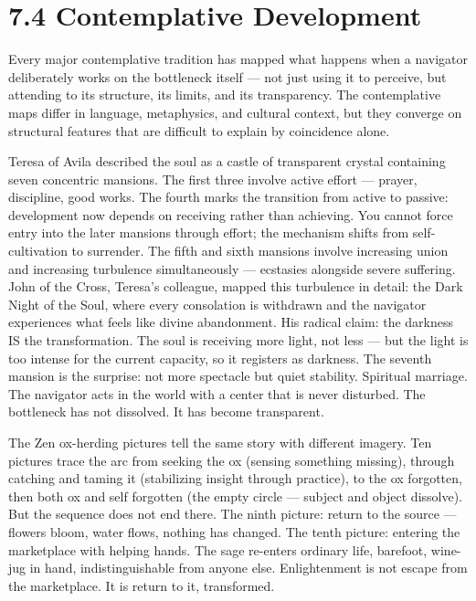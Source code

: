 \section*{7.4 Contemplative Development}


Every major contemplative tradition has mapped what happens when a navigator deliberately works on the bottleneck itself — not just using it to perceive, but attending to its structure, its limits, and its transparency. The contemplative maps differ in language, metaphysics, and cultural context, but they converge on structural features that are difficult to explain by coincidence alone.


Teresa of Avila described the soul as a castle of transparent crystal containing seven concentric mansions. The first three involve active effort — prayer, discipline, good works. The fourth marks the transition from active to passive: development now depends on receiving rather than achieving. You cannot force entry into the later mansions through effort; the mechanism shifts from self-cultivation to surrender. The fifth and sixth mansions involve increasing union and increasing turbulence simultaneously — ecstasies alongside severe suffering. John of the Cross, Teresa's colleague, mapped this turbulence in detail: the Dark Night of the Soul, where every consolation is withdrawn and the navigator experiences what feels like divine abandonment. His radical claim: the darkness IS the transformation. The soul is receiving more light, not less — but the light is too intense for the current capacity, so it registers as darkness. The seventh mansion is the surprise: not more spectacle but quiet stability. Spiritual marriage. The navigator acts in the world with a center that is never disturbed. The bottleneck has not dissolved. It has become transparent.


The Zen ox-herding pictures tell the same story with different imagery. Ten pictures trace the arc from seeking the ox (sensing something missing), through catching and taming it (stabilizing insight through practice), to the ox forgotten, then both ox and self forgotten (the empty circle — subject and object dissolve). But the sequence does not end there. The ninth picture: return to the source — flowers bloom, water flows, nothing has changed. The tenth picture: entering the marketplace with helping hands. The sage re-enters ordinary life, barefoot, wine-jug in hand, indistinguishable from anyone else. Enlightenment is not escape from the marketplace. It is return to it, transformed.


